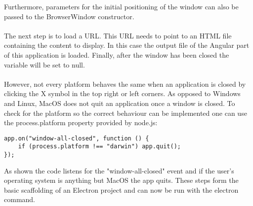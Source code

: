 Furthermore, parameters for the initial positioning of the window can also be passed to the BrowserWindow constructor.\paragraph{}
The next step is to load a URL.
This URL needs to point to an HTML file containing the content to display. 
In this case the output file of the Angular part of this application is loaded. 
Finally, after the window has been closed the variable will be set to null.\paragraph{}
However, not every platform behaves the same when an application is closed by clicking the X symbol in the top 
right or left corners. 
As opposed to Windows and Linux, MacOS does not quit an application once a window is closed. 
To check for the platform so the correct behaviour can be implemented one can use the process.platform \parencite{nodeDocs} property
provided by node.js:
\begin{lstlisting}
app.on("window-all-closed", function () {
    if (process.platform !== "darwin") app.quit();
});
\end{lstlisting}
As shown the code listens for the "window-all-closed" event and if the user's operating system is anything but MacOS 
the app quits. 
These steps form the basic scaffolding of an Electron project and can now be run with the electron command.